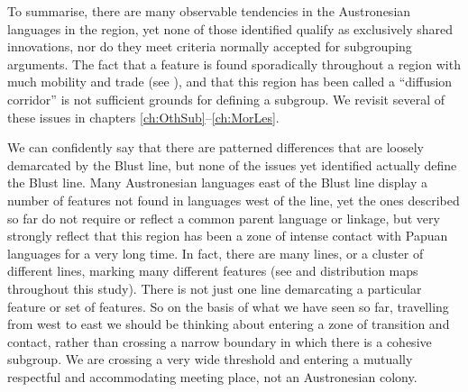 To summarise, there are many observable tendencies in the Austronesian languages in the region,
yet none of those identified qualify as exclusively shared innovations,
nor do they meet criteria normally accepted for subgrouping arguments.
The fact that a feature is found sporadically throughout a region with much mobility
and trade (see ),
and that this region has been called a “diffusion corridor” is not sufficient grounds for defining a subgroup.
We revisit several of these issues in chapters \ref{ch:OthSub}--\ref{ch:MorLes}.

We can confidently say that there are patterned differences that are loosely demarcated by the Blust
line, but none of the issues yet identified actually define the Blust line.
Many Austronesian languages east of the Blust line display a number of features not found in languages
west of the line,
yet the ones described so far do not require or reflect a common parent language or linkage,
but very strongly reflect that this region has been a zone of intense contact with Papuan languages for
a very long time.
In fact, there are many lines,
or a cluster of different lines,
marking many different features (see 
and distribution maps throughout this study).
There is not just one line
demarcating a particular feature or set of features.
So on the basis of what we have seen so far,
travelling from west to east we should be thinking about entering a zone of transition
and contact, rather than crossing a narrow boundary in which there is a cohesive subgroup.
We are crossing a very wide threshold
and entering a mutually respectful
and accommodating meeting place,
not an Austronesian colony.

